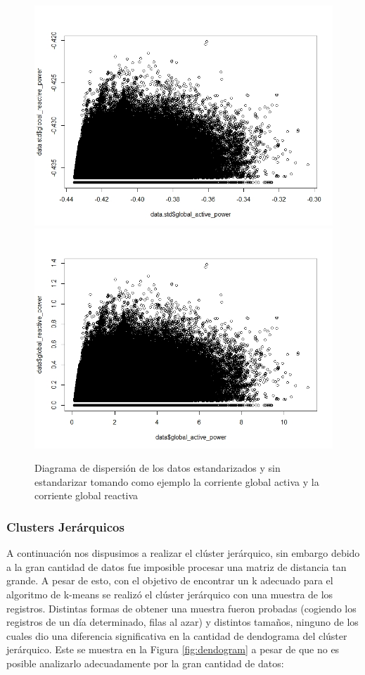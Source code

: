 \documentclass[a4paper,10pt,twocolumn]{report}
\begin{document}
	\begin{figure}[H]
	\centering
	\includegraphics[width=0.9\linewidth]{"img/cluster/diagrama de dispersion estandarizado"}
	\includegraphics[width=0.9\linewidth]{"img/cluster/diagrama de dispersion"}
	\caption{Diagrama de dispersión de los datos estandarizados y sin estandarizar tomando como ejemplo la corriente global activa y la corriente global reactiva}
	\label{fig:dispersion_cluster}
	\end{figure}
	 	
	 \subsubsection{Clusters Jerárquicos}
	 A continuación nos dispusimos a realizar el clúster jerárquico, sin embargo debido a la gran cantidad de datos fue imposible procesar una matriz de distancia tan grande. A pesar de esto, con el objetivo de encontrar un k adecuado para el algoritmo de k-means se realizó el clúster jerárquico con una muestra de los registros. Distintas formas de obtener una muestra fueron probadas (cogiendo los registros de un día determinado, filas al azar) y distintos tamaños, ninguno de los cuales dio una diferencia significativa en la cantidad de dendograma del clúster jerárquico. Este se muestra en la Figura \ref{fig:dendogram} a pesar de que no es posible analizarlo adecuadamente por la gran cantidad de datos:
	 
\end{document}
